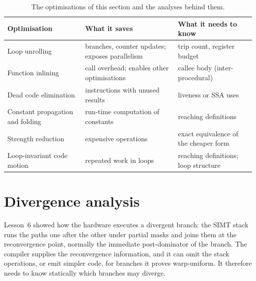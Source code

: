 \documentclass[../main.tex]{subfiles}
\begin{document}
\begin{table}[tb]
  \centering\small
  \begin{tabular}{@{}>{\raggedright\arraybackslash}p{30mm}
                    >{\raggedright\arraybackslash}p{42mm}
                    >{\raggedright\arraybackslash}p{38mm}@{}}
    \toprule
    Optimisation & What it saves & What it needs to know \\
    \midrule
    Loop unrolling & branches, counter updates; exposes parallelism &
      trip count, register budget \\
    Function inlining & call overhead; enables other optimisations &
      callee body (inter-procedural) \\
    Dead code elimination & instructions with unused results & liveness
      or SSA uses \\
    Constant propagation and folding & run-time computation of constants
      & reaching definitions \\
    Strength reduction & expensive operations & exact equivalence of the
      cheaper form \\
    Loop-invariant code motion & repeated work in loops & reaching
      definitions; loop structure \\
    \bottomrule
  \end{tabular}
  \caption{The optimisations of this section and the analyses behind
    them.}
  \label{tab:l11-optimizations}
\end{table}

\section{Divergence analysis}
\label{sec:l11-divergence}

Lesson~6 showed how the hardware executes a divergent branch: the SIMT
stack runs the paths one after the other under partial masks and joins
them at the reconvergence point, normally the immediate post-dominator
of the branch.  The compiler supplies the
reconvergence information, and it can omit the stack operations, or
emit simpler code, for branches it proves warp-uniform.  It therefore
needs to know statically which branches may diverge.
\end{document}
